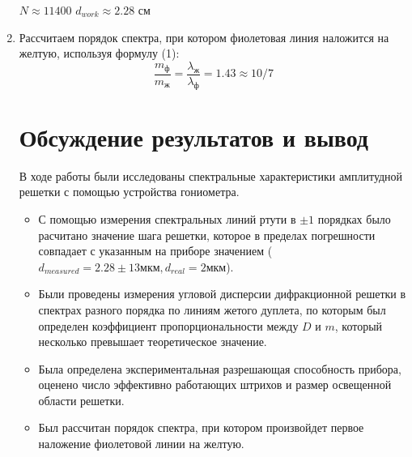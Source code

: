 \documentclass{article}
\begin{document}
\begin{enumerate}
 \begin{center}
        $N \approx 11400 $ \hspace{1cm} $ d_{work} \approx 2.28\text{ см} $
    \end{center}
\item Рассчитаем порядок спектра, при котором фиолетовая линия наложится на желтую, используя формулу (1):
\[ \dfrac{m_\text{ф}}{m_\text{ж}} = \dfrac{\lambda_\text{ж}}{\lambda_\text{ф}} = 1.43 \approx 10/7\]

\section{Обсуждение результатов и вывод}

В ходе работы были исследованы спектральные характеристики амплитудной решетки с помощью устройства гониометра.
\begin{itemize}
    \item С помощью измерения спектральных линий ртути в $\pm 1$ порядках было расчитано значение шага решетки, которое в пределах погрешности совпадает с указанным на приборе значением ($d_{measured} = 2.28 \pm 13 \text{мкм}, d_{real} = 2 \text{мкм} $). 
    \item  Были проведены измерения угловой дисперсии дифракционной решетки в спектрах разного порядка по линиям жетого дуплета, по которым был определен коэффициент пропорциональности между $D$ и $m$, который несколько превышает теоретическое значение.
    \item Была определена экспериментальная разрешающая способность прибора, оценено число эффективно работающих штрихов и размер освещенной области решетки.
    \item Был рассчитан порядок спектра, при котором произвойдет первое наложение фиолетовой линии на желтую.
\end{itemize}



\end{enumerate}
\end{document}
